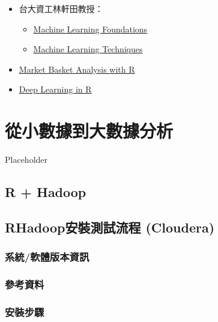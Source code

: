 \documentclass[
]{book}
\providecommand{\tightlist}{%
  \setlength{\itemsep}{0pt}\setlength{\parskip}{0pt}}
\begin{document}
\begin{itemize}
\item
  台大資工林軒田教授：

  \begin{itemize}
  \tightlist
  \item
    \href{www.coursera.org/course/ntumlone}{Machine Learning Foundations}
  \item
    \href{www.coursera.org/course/ntumltwo}{Machine Learning Techniques}
  \end{itemize}
\item
  \href{http://www.salemmarafi.com/code/market-basket-analysis-with-r/}{Market Basket Analysis with R}
\item
  \href{https://www.r-bloggers.com/deep-learning-in-r-2/}{Deep Learning in R}
\end{itemize}

\hypertarget{big}{%
\chapter{從小數據到大數據分析}\label{big}}

Placeholder

\hypertarget{r-hadoop}{%
\section{R + Hadoop}\label{r-hadoop}}

\hypertarget{rhadoopux5b89ux88ddux6e2cux8a66ux6d41ux7a0b-cloudera}{%
\section{RHadoop安裝測試流程 (Cloudera)}\label{rhadoopux5b89ux88ddux6e2cux8a66ux6d41ux7a0b-cloudera}}

\hypertarget{ux7cfbux7d71ux8edfux9ad4ux7248ux672cux8cc7ux8a0a}{%
\subsection{系統/軟體版本資訊}\label{ux7cfbux7d71ux8edfux9ad4ux7248ux672cux8cc7ux8a0a}}

\hypertarget{ux53c3ux8003ux8cc7ux6599}{%
\subsection{參考資料}\label{ux53c3ux8003ux8cc7ux6599}}

\hypertarget{ux5b89ux88ddux6b65ux9a5f}{%
\subsection{安裝步驟}\label{ux5b89ux88ddux6b65ux9a5f}}
\end{document}
